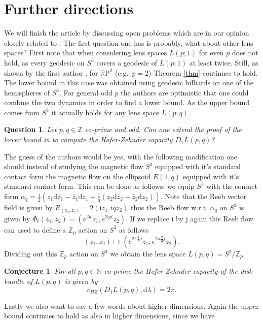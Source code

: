 \documentclass[12pt]{article}
\newtheorem{Question}[Definition]{Question}
\newtheorem{Conjecture}[Definition]{Conjecture}
\newcommand{\rp}{\mathbb{R}\mathrm{P}}
\newcommand{\Z}{\mathbb{Z}} %
\newcommand{\N}{\mathbb{N}} %
\newcommand{\dd}{\mathrm{d}}
\begin{document}
 
\section{Further directions}
We will finish the article by discussing open problems which are in our opinion closely related to . The first question one has is probably, what about other lens spaces? First note that when considering lens spaces $L(p;1)$ for even $p$  does not hold, as every geodesic on $S^3$ covers a geodesic of $L(p;1)$ at least twice. Still, as shown by the first author \cite{B23}, for $\rp^2$ (e.g.\ $p=2$) Theorem \ref{thm} continues to hold. The lower bound in this case was obtained using geodesic billiards on one of the hemispheres of $S^3$. For general odd $p$ the authors are optimistic that one could combine the two dynamics in order to find a lower bound. As the upper bound comes from $S^3$ it actually holds for any lens space $L(p;q)$. 
 \begin{Question}
     Let $p,q\in\Z$ co-prime and odd. Can one extend the proof of the lower bound in  to compute the Hofer-Zehnder capacity $D_1L(p,q)$?
 \end{Question}
 \noindent
 The guess of the authors would be yes, with the following modification one should instead of studying the magnetic flow $S^3$ equipped with it's standard contact form the magnetic flow on the ellipsoid $E\left(1,q\right)$ equipped with it's standard contact form. This can be done as follows: we equip $S^3$ with the contact form $\alpha_{q}=\frac{\mathrm{i}}{2}\left(z_1\dd \bar{z_1}-\bar{z}_1\dd z_1+ \frac{1}{q} \left(z_2\dd \bar{z}_2-\bar{z}_2\dd z_2 \right) \right)$. Note that the Reeb vector field is given by $R_{(z_1,z_2)}= 2(\mathrm{i} z_1, \mathrm{i} q z_2)$ thus the Reeb flow w.r.t. $\alpha_q$ on $S^3$ is given by $\varPhi_t(z_1,z_2)= \left(e^{2\mathrm{i}t} z_1,  e^{2 q\mathrm{i}t} z_2\right)$. If we replace $\mathrm{i}$ by $\mathrm{j}$ again this Reeb flow can used to define a $\Z_p$ action on $S^3$ as follows
 \[
 (z_1, z_2)\mapsto \left(e^{2\pi \frac{1}{p}j}z_1,e^{2\pi \frac{q}{p}j}z_2\right). 
 \]
 Dividing out this $\Z_p$ action on $S^3$ we obtain the lens space $L(p,q)=S^3/\Z_p$. 
\begin{Conjecture}
     For all $p,q\in \N$ co-prime the Hofer-Zehnder capacity of the disk bundle of $L(p,q)$ is given by
     $$
 c_{HZ}\left( D_1L(p,q), \dd\lambda\right)= 2\pi. 
 $$
\end{Conjecture} 
\noindent
Lastly we also want to say a few words about higher dimensions. Again the upper bound continues to hold as also in higher dimensions, since we have
\end{document}

